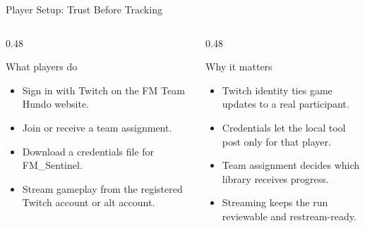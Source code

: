 \documentclass[aspectratio=169,11pt]{beamer}
\begin{document}
\begin{frame}{Player Setup: Trust Before Tracking}
  \begin{columns}[T,onlytextwidth]
    \begin{column}{0.48\textwidth}
      \begin{block}{What players do}
        \begin{itemize}
          \item Sign in with Twitch on the FM Team Hundo website.
          \item Join or receive a team assignment.
          \item Download a credentials file for FM\_Sentinel.
          \item Stream gameplay from the registered Twitch account or alt account.
        \end{itemize}
      \end{block}
    \end{column}
    \begin{column}{0.48\textwidth}
      \begin{block}{Why it matters}
        \begin{itemize}
          \item Twitch identity ties game updates to a real participant.
          \item Credentials let the local tool post only for that player.
          \item Team assignment decides which library receives progress.
          \item Streaming keeps the run reviewable and restream-ready.
        \end{itemize}
      \end{block}
    \end{column}
  \end{columns}
\end{frame}
\end{document}
